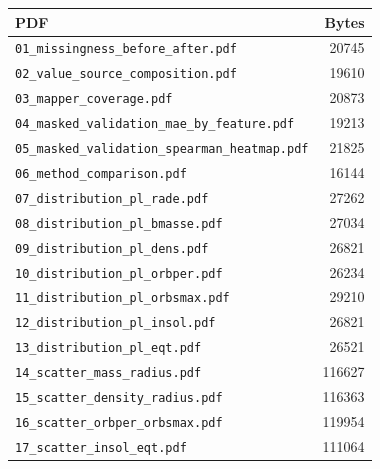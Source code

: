 \documentclass[11pt,letterpaper]{article}
\newcommand{\code}[1]{\ifmmode\text{\texttt{#1}}\else\texttt{#1}\fi}
\begin{document}
\begin{center}
\begin{longtable}{lr}
\toprule
PDF & Bytes\\
\midrule
\endhead
\code{01\_missingness\_before\_after.pdf} & 20745\\
\code{02\_value\_source\_composition.pdf} & 19610\\
\code{03\_mapper\_coverage.pdf} & 20873\\
\code{04\_masked\_validation\_mae\_by\_feature.pdf} & 19213\\
\code{05\_masked\_validation\_spearman\_heatmap.pdf} & 21825\\
\code{06\_method\_comparison.pdf} & 16144\\
\code{07\_distribution\_pl\_rade.pdf} & 27262\\
\code{08\_distribution\_pl\_bmasse.pdf} & 27034\\
\code{09\_distribution\_pl\_dens.pdf} & 26821\\
\code{10\_distribution\_pl\_orbper.pdf} & 26234\\
\code{11\_distribution\_pl\_orbsmax.pdf} & 29210\\
\code{12\_distribution\_pl\_insol.pdf} & 26821\\
\code{13\_distribution\_pl\_eqt.pdf} & 26521\\
\code{14\_scatter\_mass\_radius.pdf} & 116627\\
\code{15\_scatter\_density\_radius.pdf} & 116363\\
\code{16\_scatter\_orbper\_orbsmax.pdf} & 119954\\
\code{17\_scatter\_insol\_eqt.pdf} & 111064\\
\bottomrule
\end{longtable}
\end{center}
\end{document}
